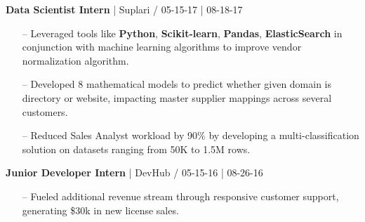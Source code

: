 \documentclass{article}
\begin{document}
\begin{multicols}{2}
{{\begin{itemize}
\end{itemize}
}}
\hfill \break
{\footnotesize{\textbf{Data Scientist Intern} | Suplari / 05-15-17 | 08-18-17}}
{\footnotesize{
\begin{itemize}
	\item[--] Leveraged tools like \textbf{Python}, \textbf{Scikit-learn}, \textbf{Pandas}, \textbf{ElasticSearch} in conjunction with machine learning algorithms to improve vendor normalization algorithm.
	\item[--] Developed 8 mathematical models to predict whether given domain is directory or website, impacting master supplier mappings across several customers.
	\item[--] Reduced Sales Analyst workload by 90\% by developing a multi-classification solution on datasets ranging from 50K to 1.5M rows.
\end{itemize}
}}
\hfill \break
{\footnotesize{\textbf{Junior Developer Intern} | DevHub / 05-15-16 | 08-26-16}}
{\footnotesize{
\begin{itemize}
	\item[--] Fueled additional revenue stream through responsive customer support, generating \$30k in new license sales. 

\end{itemize}}}
\end{multicols}
\end{document}
